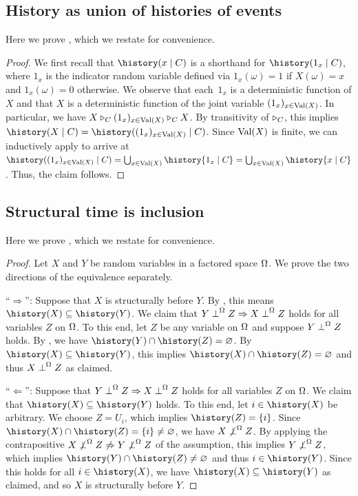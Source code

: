 \documentclass[USenglish,onecolumn]{article}
\begin{document}
\subsection{History as union of histories of events}
\label{sec:proofunionhistory}
Here we prove , which we restate for convenience.
\lemmaunionhistory*
\begin{proof}
  We first recall that $\history(x\given C)$ is a shorthand for $\history(1_x\given C)$, where $1_x$ is the indicator random variable defined via $1_x(\omega)=1$ if $X(\omega)=x$ and $1_x(\omega)=0$ otherwise.
  We observe that each~$1_x$ is a deterministic function of $X$ and that $X$ is a deterministic function of the joint variable $(1_x)_{x\in\textnormal{Val}(X)}$. In particular, we have $X\triangleright_C (1_x)_{x\in\textnormal{Val}(X)}\triangleright_C X$.
  By transitivity of $\triangleright_C$, this implies $\history(X\given C) = \history((1_x)_{x\in\Val(X)}\given C)$.
  Since $\textnormal{Val}(X)$ is finite, we can inductively apply  to arrive at
  $\history((1_x)_{x\in\Val(X)}\given C)=\bigcup_{x\in\Val(X)}\history{1_x \given C}=\bigcup_{x\in\Val(X)}\history{x \given C}$.
  Thus, the claim follows.
\end{proof}



\subsection{Structural time is inclusion}
\label{sec:proofstructuraltime}
Here we prove , which we restate for convenience.

\structuraltimehistory*

\begin{proof}
  Let $X$ and $Y$ be random variables in a factored space $\Omega$. We prove the two directions of the equivalence separately.

  ``$\Rightarrow$'': Suppose that $X$ is structurally before $Y$. By , this means $\history(X)\subseteq\history(Y)$.
  We claim that \(Y \mathrel{\perp}^\Omega Z \Rightarrow X\mathrel{\perp}^\Omega Z\) holds for all variables \(Z\) on \(\Omega\). To this end, let $Z$ be any variable on $\Omega$ and suppose $Y\mathrel{\perp}^\Omega Z$ holds.
  By , we have $\history(Y)\cap\history(Z)=\nothing$.
  By $\history(X)\subseteq\history(Y)$, this implies $\history(X)\cap\history(Z)=\nothing$ and thus $X\mathrel{\perp}^\Omega Z$ as claimed.

  ``$\Leftarrow$'':
  Suppose that \(Y \mathrel{\perp}^\Omega Z \Rightarrow X\mathrel{\perp}^\Omega Z\) holds for all variables \(Z\) on \(\Omega\). We claim that $\history(X)\subseteq\history(Y)$ holds.
  To this end, let $i\in \history(X)$ be arbitrary. We choose $Z=U_i$, which implies $\history(Z)=\{i\}$.
  Since $\history(X)\cap\history(Z)=\{i\}\neq\nothing$, we have $X\not\mathrel{\perp}^\Omega Z$. By applying the contrapositive  \(X\not\mathrel{\perp}^\Omega Z \not\Rightarrow Y \not\mathrel{\perp}^\Omega Z \) of the assumption, this implies $Y\not\mathrel{\perp}^\Omega Z$, which implies $\history(Y)\cap\history(Z)\neq\nothing$ and thus $i\in\history(Y)$.
  Since this holds for all $i\in\history(X)$, we have $\history(X)\subseteq\history(Y)$ as claimed, and so $X$ is structurally before $Y$.
\end{proof}
\end{document}
